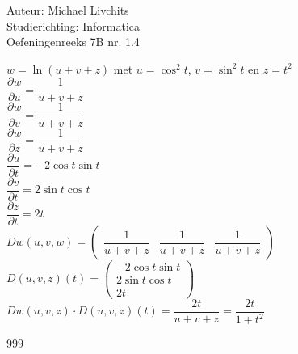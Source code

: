 \documentclass[a4paper]{article}
\begin{document}
  
\noindent \large Auteur: Michael Livchits \\
\noindent \large Studierichting: Informatica\\
\noindent \large Oefeningenreeks 7B nr. 1.4\\

\medskip

\normalsize

$w = \ln(u+v+z)$ met $u = \cos^2t$, $v = \sin^2t$ en $z = t^2$\\

$\dfrac{\partial w}{\partial u} = \dfrac{1}{u+v+z}$\\

$\dfrac{\partial w}{\partial v} = \dfrac{1}{u+v+z}$\\

$\dfrac{\partial w}{\partial z} = \dfrac{1}{u+v+z}$\\

$\dfrac{\partial u}{\partial t} = -2\cos t\sin t$\\

$\dfrac{\partial v}{\partial t} = 2\sin t\cos t$\\

$\dfrac{\partial z}{\partial t} = 2t$\\

$Dw(u,v,w)=\left(\begin{array}{ccc}
\dfrac{1}{u+v+z} & \dfrac{1}{u+v+z} & \dfrac{1}{u+v+z}
\end{array}\right)$\\

$D(u,v,z)(t)=\left(\begin{array}{c}
-2\cos t\sin t \\
2\sin t\cos t \\
2t
\end{array}\right)$\\

$Dw(u,v,z)\cdot D(u,v,z)(t) = \dfrac{2t}{u+v+z} = \dfrac{2t}{1+t^2}$\\

\begin{thebibliography}{999}
\end{thebibliography}
\end{document}
